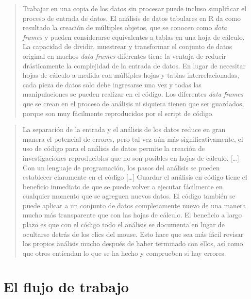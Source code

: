 \documentclass[
  letterpaper,
  DIV=11,
  numbers=noendperiod,
  oneside]{scrreprt}
\begin{document}
\begin{quote}
Trabajar en una copia de los datos sin procesar puede incluso
simplificar el proceso de entrada de datos. El análisis de datos
tabulares en R da como resultado la creación de múltiples objetos, que
se conocen como \emph{data frames} y pueden considerarse equivalentes a
tablas en una hoja de cálculo. La capacidad de dividir, muestrear y
transformar el conjunto de datos original en muchos \emph{data frames}
diferentes tiene la ventaja de reducir drásticamente la complejidad de
la entrada de datos. En lugar de necesitar hojas de cálculo a medida con
múltiples hojas y tablas interrelacionadas, cada pieza de datos solo
debe ingresarse una vez y todas las manipulaciones se pueden realizar en
el código. Los diferentes \emph{data frames} que se crean en el proceso
de análisis ni siquiera tienen que ser guardados, porque son muy
fácilmente reproducidos por el script de código.
\end{quote}

\begin{quote}
La separación de la entrada y el análisis de los datos reduce en gran
manera el potencial de errores, pero tal vez aún más significativamente,
el uso de código para el análisis de datos permite la creación de
investigaciones reproducibles que no son posibles en hojas de cálculo.
{[}\ldots{]} Con un lenguaje de programación, los pasos del análisis se
pueden establecer claramente en el código {[}\ldots{]} Guardar el
análisis en código tiene el beneficio inmediato de que se puede volver a
ejecutar fácilmente en cualquier momento que se agreguen nuevos datos.
El código también se puede aplicar a un conjunto de datos completamente
nuevo de una manera mucho más transparente que con las hojas de cálculo.
El beneficio a largo plazo es que con el código todo el análisis se
documenta en lugar de ocultarse detrás de los clics del mouse. Esto hace
que sea más fácil revisar los propios análisis mucho después de haber
terminado con ellos, así como que otros entiendan lo que se ha hecho y
comprueben si hay errores.
\end{quote}

\hypertarget{el-flujo-de-trabajo}{%
\section{El flujo de trabajo}\label{el-flujo-de-trabajo}}
\end{document}
